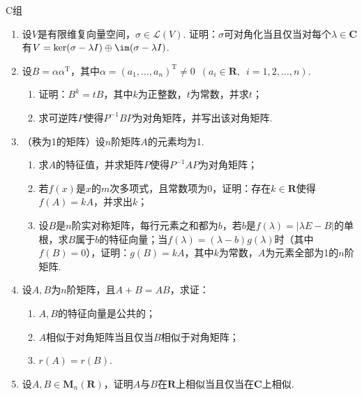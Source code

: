 \centerline{\heiti C组}
\begin{enumerate}
    \item 设$V$是有限维复向量空间，$\sigma\in \mathcal{L}(V)$. 证明：$\sigma$可对角化当且仅当对每个$\lambda\in\mathbf{C}$有$V=\ker(\sigma-\lambda I)\oplus\im(\sigma-\lambda I)$.

    \item 设$B=\alpha\alpha^\mathrm{T}$，其中$\alpha=(a_1,\ldots,a_n)^\mathrm{T}\neq 0\enspace(a_i\in\mathbf{R},\enspace i=1,2,\ldots,n)$.
          \begin{enumerate}
              \item 证明：$B^k=tB$，其中$k$为正整数，$t$为常数，并求$t$；

              \item 求可逆阵$P$使得$P^{-1}BP$为对角矩阵，并写出该对角矩阵.
          \end{enumerate}

    \item （秩为1的矩阵）设$n$阶矩阵$A$的元素均为1.
          \begin{enumerate}
              \item 求$A$的特征值，并求矩阵$P$使得$P^{-1}AP$为对角矩阵；

              \item 若$f(x)$是$x$的$m$次多项式，且常数项为0，证明：存在$k\in\mathbf{R}$使得$f(A)=kA$，并求出$k$；

              \item 设$B$是$n$阶实对称矩阵，每行元素之和都为$b$，若$b$是$f(\lambda)=|\lambda E-B|$的单根，求$B$属于$b$的特征向量；当$f(\lambda)=(\lambda-b)g(\lambda)$时（其中$f(B)=0$），证明：$g(B)=kA$，其中$k$为常数，$A$为元素全部为1的$n$阶矩阵.
          \end{enumerate}

    \item 设$A,B$为$n$阶矩阵，且$A+B=AB$，求证：
          \begin{enumerate}
              \item $A,B$的特征向量是公共的；

              \item $A$相似于对角矩阵当且仅当$B$相似于对角矩阵；

              \item $r(A)=r(B)$.
          \end{enumerate}

    \item 设$A,B\in \mathbf{M}_n(\mathbf{R})$，证明$A$与$B$在$\mathbf{R}$上相似当且仅当在$\mathbf{C}$上相似.


\end{enumerate}

